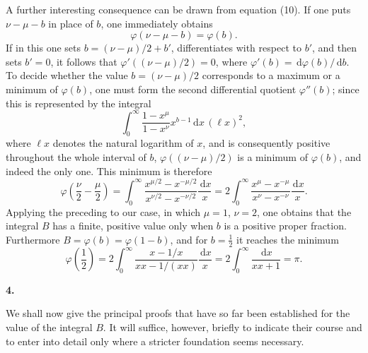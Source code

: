 \documentclass[11pt]{article}
\newcommand{\dd}{\,\mathrm d}
\newcommand{\art}[1]{\bigskip\begin{center}\large\bfseries #1.\end{center}\nopagebreak}
\begin{document}
A further interesting consequence can be drawn from equation (10). If one puts $\nu-\mu-b$ in place of $b$, one immediately obtains
\begin{equation}
\varphi(\nu-\mu-b)=\varphi(b).
\tag{11}
\end{equation}
If in this one sets $b=(\nu-\mu)/2+b'$, differentiates with respect to $b'$, and then sets $b'=0$, it follows that $\varphi'((\nu-\mu)/2)=0$, where $\varphi'(b)=\dd\varphi(b)/\dd b$. To decide whether the value $b=(\nu-\mu)/2$ corresponds to a maximum or a minimum of $\varphi(b)$, one must form the second differential quotient $\varphi''(b)$; since this is represented by the integral
\[
\int_0^\infty \frac{1-x^\mu}{1-x^\nu}x^{b-1}\dd x\,(\ell x)^2,
\]
where $\ell x$ denotes the natural logarithm of $x$, and is consequently positive throughout the whole interval of $b$, $\varphi((\nu-\mu)/2)$ is a minimum of $\varphi(b)$, and indeed the only one. This minimum is therefore
\begin{equation}
\varphi\left(\frac{\nu}{2}-\frac{\mu}{2}\right)=
\int_0^\infty \frac{x^{\mu/2}-x^{-\mu/2}}{x^{\nu/2}-x^{-\nu/2}}\frac{\dd x}{x}
=2\int_0^\infty \frac{x^\mu-x^{-\mu}}{x^\nu-x^{-\nu}}\frac{\dd x}{x}.
\tag{12}
\end{equation}
Applying the preceding to our case, in which $\mu=1$, $\nu=2$, one obtains that the integral $B$ has a finite, positive value only when $b$ is a positive proper fraction. Furthermore $B=\varphi(b)=\varphi(1-b)$, and for $b=\tfrac12$ it reaches the minimum
\begin{equation}
\varphi\left(\frac12\right)=2\int_0^\infty \frac{x-1/x}{xx-1/(xx)}\frac{\dd x}{x}
=2\int_0^\infty \frac{\dd x}{xx+1}=\pi.
\tag{13}
\end{equation}

\art{4}

We shall now give the principal proofs that have so far been established for the value of the integral $B$. It will suffice, however, briefly to indicate their course and to enter into detail only where a stricter foundation seems necessary.
\end{document}
